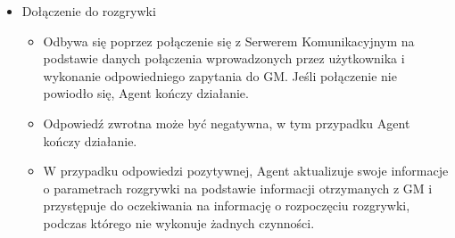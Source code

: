 \documentclass[../Dokumentacja.tex]{subfiles}
\begin{document}
\begin{itemize}
    \item Dołączenie do rozgrywki
    \begin{itemize}
        \item Odbywa się poprzez połączenie się z Serwerem Komunikacyjnym na podstawie danych połączenia wprowadzonych przez użytkownika i wykonanie odpowiedniego zapytania do GM. Jeśli połączenie nie powiodło się, Agent kończy działanie.
        \item Odpowiedź zwrotna może być negatywna, w tym przypadku Agent kończy działanie.
        \item W przypadku odpowiedzi pozytywnej, Agent aktualizuje swoje informacje o parametrach rozgrywki na podstawie informacji otrzymanych z GM i przystępuje do oczekiwania na informację o rozpoczęciu rozgrywki, podczas którego nie wykonuje żadnych czynności.
    \end{itemize}


\end{itemize}
\end{document}
